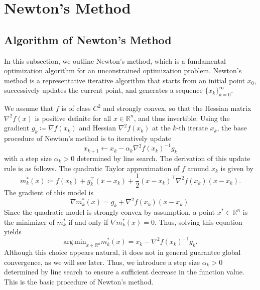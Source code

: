 \documentclass[0_en]{subfiles}
\begin{document}
\section{Newton's Method}\label{sec:background_newton}

\subsection{Algorithm of Newton's Method}

In this subsection, we outline Newton's method, which is a fundamental optimization algorithm for an unconstrained optimization problem.
Newton's method is a representative iterative algorithm that starts from an initial point $x_0$, successively updates the current point, and generates a sequence $\{x_k\}_{k=0}^\infty$.

We assume that $f$ is of class $C^2$ and strongly convex, so that the Hessian matrix $\nabla^2 f(x)$ is positive definite for all $x \in \mathbb{R}^n$, and thus invertible.
Using the gradient $g_k \coloneqq \nabla f(x_k)$ and Hessian $\nabla^2 f(x_k)$ at the $k$-th iterate $x_k$, the base procedure of Newton's method is to iteratively update
\begin{equation*}
    x_{k+1} \gets x_k - \alpha_k \nabla^2 f(x_k)^{-1} g_k
\end{equation*}
with a step size $\alpha_k > 0$ determined by line search.
The derivation of this update rule is as follows.
The quadratic Taylor approximation of $f$ around $x_k$ is given by
\begin{equation*}
    m^*_{k}(x) \coloneqq f(x_k) + g_k^\top (x - x_k) + \frac{1}{2} (x - x_k)^\top \nabla^2 f(x_k) (x - x_k).
\end{equation*}
The gradient of this model is
\begin{equation*}
    \nabla m^*_k(x) = g_k + \nabla^2 f(x_k)(x - x_k).
\end{equation*}
Since the quadratic model is strongly convex by assumption, a point $x^* \in \mathbb{R}^n$ is the minimizer of $m^*_k$ if and only if $\nabla m^*_k(x) = 0$. Thus, solving this equation yields
\begin{equation*}
    \mathrm{arg\,min}_{x\in\mathbb{R}^n} m^*_{k}(x) = x_k -\nabla^2 f(x_k)^{-1} g_k.
\end{equation*}
Although this choice appears natural, it does not in general guarantee global convergence, as we will see later.
Thus, we introduce a step size $\alpha_k > 0$ determined by line search to ensure a sufficient decrease in the function value.
This is the basic procedure of Newton's method.
\end{document}
